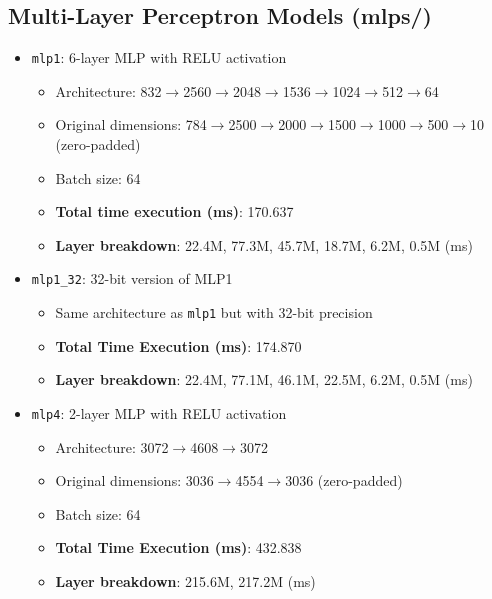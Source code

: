 \subsection{Multi-Layer Perceptron Models (mlps/)}
\begin{itemize}
\item \texttt{mlp1}: 6-layer MLP with RELU activation
  \begin{itemize}
  \item Architecture: 832$\rightarrow$2560$\rightarrow$2048$\rightarrow$1536$\rightarrow$1024$\rightarrow$512$\rightarrow$64
  \item Original dimensions: 784$\rightarrow$2500$\rightarrow$2000$\rightarrow$1500$\rightarrow$1000$\rightarrow$500$\rightarrow$10 (zero-padded)
  \item Batch size: 64
  \item \textbf{Total time execution (ms)}: 170.637
  \item \textbf{Layer breakdown}: 22.4M, 77.3M, 45.7M, 18.7M, 6.2M, 0.5M (ms)
  \end{itemize}

\item \texttt{mlp1\_32}: 32-bit version of MLP1
  \begin{itemize}
  \item Same architecture as \texttt{mlp1} but with 32-bit precision
  \item \textbf{Total Time Execution (ms)}: 174.870
  \item \textbf{Layer breakdown}: 22.4M, 77.1M, 46.1M, 22.5M, 6.2M, 0.5M (ms)
  \end{itemize}
  
\item \texttt{mlp4}: 2-layer MLP with RELU activation
  \begin{itemize}
  \item Architecture: 3072$\rightarrow$4608$\rightarrow$3072
  \item Original dimensions: 3036$\rightarrow$4554$\rightarrow$3036 (zero-padded)
  \item Batch size: 64
  \item \textbf{Total Time Execution (ms)}: 432.838
  \item \textbf{Layer breakdown}: 215.6M, 217.2M (ms)
  \end{itemize}
\end{itemize}

